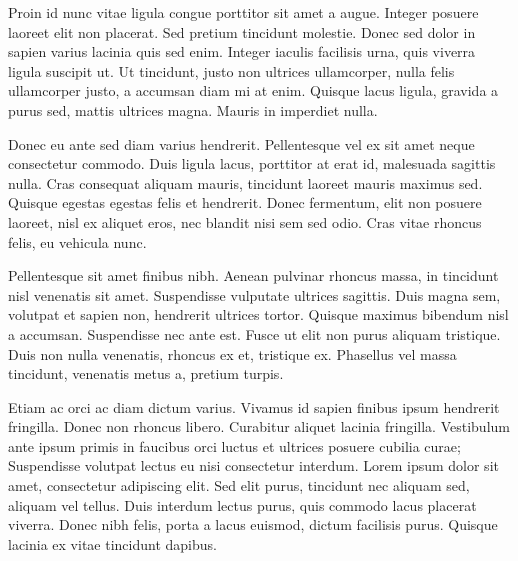 \documentclass[a4paper, 11pt]{report}
\begin{document}
Proin id nunc vitae ligula congue porttitor sit amet a augue. Integer posuere laoreet elit non placerat. Sed pretium tincidunt molestie. Donec sed dolor in sapien varius lacinia quis sed enim. Integer iaculis facilisis urna, quis viverra ligula suscipit ut. Ut tincidunt, justo non ultrices ullamcorper, nulla felis ullamcorper justo, a accumsan diam mi at enim. Quisque lacus ligula, gravida a purus sed, mattis ultrices magna. Mauris in imperdiet nulla.

Donec eu ante sed diam varius hendrerit. Pellentesque vel ex sit amet neque consectetur commodo. Duis ligula lacus, porttitor at erat id, malesuada sagittis nulla. Cras consequat aliquam mauris, tincidunt laoreet mauris maximus sed. Quisque egestas egestas felis et hendrerit. Donec fermentum, elit non posuere laoreet, nisl ex aliquet eros, nec blandit nisi sem sed odio. Cras vitae rhoncus felis, eu vehicula nunc.

Pellentesque sit amet finibus nibh. Aenean pulvinar rhoncus massa, in tincidunt nisl venenatis sit amet. Suspendisse vulputate ultrices sagittis. Duis magna sem, volutpat et sapien non, hendrerit ultrices tortor. Quisque maximus bibendum nisl a accumsan. Suspendisse nec ante est. Fusce ut elit non purus aliquam tristique. Duis non nulla venenatis, rhoncus ex et, tristique ex. Phasellus vel massa tincidunt, venenatis metus a, pretium turpis.

Etiam ac orci ac diam dictum varius. Vivamus id sapien finibus ipsum hendrerit fringilla. Donec non rhoncus libero. Curabitur aliquet lacinia fringilla. Vestibulum ante ipsum primis in faucibus orci luctus et ultrices posuere cubilia curae; Suspendisse volutpat lectus eu nisi consectetur interdum. Lorem ipsum dolor sit amet, consectetur adipiscing elit. Sed elit purus, tincidunt nec aliquam sed, aliquam vel tellus. Duis interdum lectus purus, quis commodo lacus placerat viverra. Donec nibh felis, porta a lacus euismod, dictum facilisis purus. Quisque lacinia ex vitae tincidunt dapibus.



\makedocumentbackpage
\end{document}
